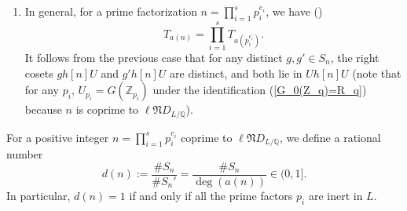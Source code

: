 \documentclass[11pt,oneside,reqno]{amsart}
\newcommand{\Q}{\mathbb{Q}}
\newcommand{\Z}{\mathbb{Z}}
\newcommand{\Nfrak}{\mathfrak{N}}
\theoremstyle{plain}
\begin{document}
\begin{enumerate}
\begin{proof}
			
			
			
			If $q$ is inert in $L$, write
			$g^{-1}g'=\begin{pmatrix}
				a & b \\ c & d
			\end{pmatrix}$. By definition of $S_n$, one checks that $b/n\notin\Z_q$. Then we have
			\[
			(gh[n])^{-1}(g'h[n])
			=
			\begin{pmatrix}
				a & b/n \\ cn & d
			\end{pmatrix}\notin G(\Z_q).
			\]
			It follows again that these two right cosets are distinct.
			
			
			
			
			Next we show that both cosets lie in $G(\Z_q)a(n)G(\Z_q)$. By the Cartan decomposition for $G(\Q_q)$, we can characterize $G(\Z_q)a(n)G(\Z_q)$ as the subset of $G(\Q_q)$, consisting of matrices $A=\begin{pmatrix}
				a & b \\ c & d
			\end{pmatrix}$ with $a,b,c,d\in\Z_q$ such that $\det(A)\in n\Z_q^\times$ and $a,b,c,d$ are not simultaneous divisible by $q$. Using this criterion, it follows easily that $gh[n]G(\Z_q)$ and $g'h[n]G(\Z_q)$ both lie in $G(\Z_q)a(n)G(\Z_q)$.
		\end{proof}
		In particular, if $q$ is inert in $L$, then we can take $S_n'$ to be $S_n$; if $q$ splits in $L$, we can take $S_n'$ to contain $S_n$.
		
		
		
		
		
		
		\item 
		In general, for a prime factorization $n=\prod_{i=1}^sp_i^{e_i}$, we have (\cite[Theorem 3.24]{Shimura1971})
		\[
		T_{a(n)}
		=
		\prod_{i=1}^sT_{a(p_i^{e_i})}.
		\]
		It follows from the previous case that for any distinct $g,g'\in S_n$, the right cosets $gh[n]U$ and $g'h[n]U$ are distinct, and both lie in $Uh[n]U$ (note that for any $p_i$, $U_{p_i}=G(\Z_{p_i})$ under the identification (\ref{G_0(Z_q)=R_q}) because $n$ is coprime to $\ell\Nfrak D_{L/\Q}$).
	\end{enumerate}
	
	
	
	
	
	
	
	
	
	
	
	For a positive integer $n=\prod_{i=1}^sp_i^{e_i}$ coprime to $\ell\Nfrak D_{L/\Q}$, we define a rational number
	\[
	d(n):=\frac{\#S_n}{\#S_n'}=\frac{\#S_n}{\deg(a(n))}\in(0,1].
	\]
	In particular, $d(n)=1$ if and only if all the prime factors $p_i$ are inert in $L$.
	
\end{document}
